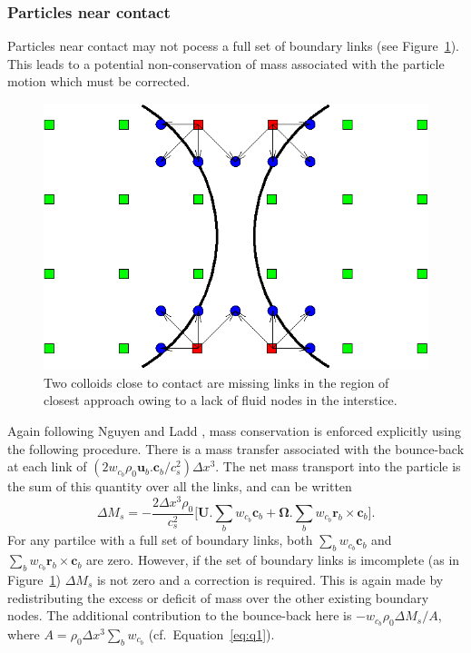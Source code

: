 \subsubsection{Particles near contact}

Particles near contact may not pocess a full set of boundary
links (see Figure~\ref{fig:f5}). This leads to a potential
non-conservation of mass associated with the particle motion
which must be corrected.


\begin{figure}[tb]
\begin{center}
\includegraphics{xfig/colloidclose.eps}
\end{center}
\caption{Two colloids close to contact are missing links in the
region of closest approach owing to a lack of fluid nodes in the
interstice.}
\label{fig:f5}
\end{figure}
Again following Nguyen and Ladd \cite{nl02}, mass conservation is
enforced explicitly using the following procedure. There is a mass
transfer associated with the bounce-back at each link of
$(2w_{c_b}\rho_0 \mathbf{u}_b . \mathbf{c}_b / c_s^2) \Delta x^3$.
The net mass transport into the particle is the sum of this
quantity over all the links, and can be written
\begin{equation}
\Delta M_s = - \frac{2\Delta x^3 \rho_0}{c_s^2}
\Big[ \mathbf{U}.\sum_b w_{c_b} \mathbf{c}_b +
  \mathbf{\Omega} . \sum_b w_{c_b} \mathbf{r}_b \times \mathbf{c}_b \Big].
\end{equation}
For any partilce with a full set of boundary links, both
$\sum_b w_{c_b} \mathbf{c}_b$
and $\sum_b w_{c_b} \mathbf{r}_b \times \mathbf{c}_b$ are zero.
However, if the set of boundary links is imcomplete
(as in Figure~\ref{fig:f5}) $\Delta M_s$ is not zero and
a correction is required. This is again made by redistributing the
excess or deficit of mass over the other existing boundary nodes.
The additional contribution to the bounce-back here is
$-w_{c_b} \rho_0 \Delta M_s/A$, where
$A = \rho_0 \Delta x^3 \sum_b w_{c_b}$ (cf.\ Equation~\ref{eq:q1}).

